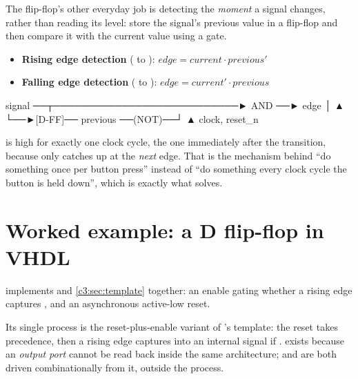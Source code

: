 The flip-flop's other everyday job is detecting the \emph{moment} a signal changes, rather than
reading its level: store the signal's previous value in a flip-flop and then compare it with the
current value using a gate.

\begin{itemize}
  \item \textbf{Rising edge detection} ( to ):
    $\mathit{edge} = \mathit{current} \cdot \mathit{previous}'$
  \item \textbf{Falling edge detection} ( to ):
    $\mathit{edge} = \mathit{current}' \cdot \mathit{previous}$
\end{itemize}

\begin{textdrawing}
signal ──┬───────────────────────────► AND ──► edge
         │                              ▲
         └──►[D-FF]── previous ──(NOT)──┘
                ▲
           clock, reset_n
\end{textdrawing}

 is high for exactly one clock cycle, the one immediately after the transition, because
 only catches up at the \emph{next} edge. That is the mechanism behind ``do
something once per button press'' instead of ``do something every clock cycle the button is held
down'', which is exactly what  solves.

\section{Worked example: a D flip-flop in VHDL}
\label{c3:sec:dffvhdl}

 implements  and \ref{c3:sec:template} together: an enable
gating whether a rising edge captures , and an asynchronous active-low reset.


Its single process is the reset-plus-enable variant of 's template: the
reset takes precedence, then a rising edge captures  into an internal signal  if
.  exists because an \emph{output port} cannot be read back inside the
same architecture;  and  are both driven combinationally from it, outside the
process.

